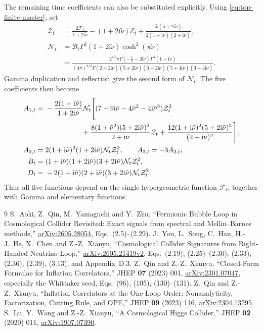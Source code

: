 \documentclass[a4paper,12pt]{article}
\newcommand{\ii}{\mathrm i}
\begin{document}
The remaining time coefficients can also be substituted explicitly.
Using \eqref{eq:top-finite-master}, set
\begin{align}
 \mathcal Z_t&=\frac{2\mathcal F_t}{1+2\ii\tilde\nu}
 -(1+2\ii\tilde\nu)\mathcal E_t
 +\frac{\ii\tilde\nu(5+2\ii\tilde\nu)}
 {2(1+\ii\tilde\nu)(2+\ii\tilde\nu)},\nonumber\\
 \mathcal N_t&=\mathcal B_t\Gamma^2(1+2\ii\tilde\nu)
 \cosh^2(\pi\tilde\nu)\nonumber\\
 &=\frac{2^{4\ii\tilde\nu}\pi\Gamma(-\tfrac12-2\ii\tilde\nu)
 \Gamma^4(1+\ii\tilde\nu)}
 {(4\pi)^{7/2}\Gamma(2+2\ii\tilde\nu)
 (5+2\ii\tilde\nu)(3+2\ii\tilde\nu)
 (5+4\ii\tilde\nu)(3+4\ii\tilde\nu)}.
 \label{eq:top-angular-explicit-common}
\end{align}
Gamma duplication and reflection give the second form of
$\mathcal N_t$. The five coefficients then become
\begin{align}
 A_{1,t}={}&-\frac{2(1+\ii\tilde\nu)}{1+2\ii\tilde\nu}\mathcal N_t
 \Bigg[(7-9\ii\tilde\nu-4\tilde\nu^2-4\ii\tilde\nu^3)\mathcal Z_t^2
 \nonumber\\
 &\hspace{18mm}
 +\frac{8(1+\tilde\nu^2)(5+2\ii\tilde\nu)^2}{2+\ii\tilde\nu}\mathcal Z_t
 +\frac{12(1+\ii\tilde\nu)^2(5+2\ii\tilde\nu)^3}{(2+\ii\tilde\nu)^2}
 \Bigg],\nonumber\\
 A_{2,t}={}&2(1+\ii\tilde\nu)^2(1+2\ii\tilde\nu)\mathcal N_t\mathcal Z_t^2,
 \qquad A_{3,t}=-3A_{2,t},\nonumber\\
 B_t={}&(1+\ii\tilde\nu)(1+2\ii\tilde\nu)(3+2\ii\tilde\nu)
 \mathcal N_t\mathcal Z_t^2,\nonumber\\
 D_t={}&-2(1+\ii\tilde\nu)(2+\ii\tilde\nu)(3+2\ii\tilde\nu)
 \mathcal N_t\mathcal Z_t^2.
 \label{eq:top-angular-explicit-finite}
\end{align}
Thus all five functions depend on the single hypergeometric function
$\mathcal F_t$, together with Gamma and elementary functions.

\begin{thebibliography}{9}
 S.~Aoki, Z.~Qin, M.~Yamaguchi and Y.~Zhu,
``Fermionic Bubble Loop in Cosmological Collider Revisited:
Exact signals from spectral and Mellin--Barnes methods,''
\href{https://arxiv.org/abs/2605.28054}{arXiv:2605.28054},
Eqs.~(2.5)--(2.29).
 J.~You, L.~Song, C.~Han, H.-J.~He, X.~Chen and Z.-Z.~Xianyu,
``Cosmological Collider Signatures from Right-Handed Neutrino Loop,''
\href{https://arxiv.org/abs/2605.21419v2}{arXiv:2605.21419v2},
Eqs.~(2.19), (2.25)--(2.30), (2.33), (2.36), (2.39),
(3.13), and Appendix~D.3.
 Z.~Qin and Z.-Z.~Xianyu, ``Closed-Form Formulae for
Inflation Correlators,'' JHEP \textbf{07} (2023) 001,
\href{https://arxiv.org/abs/2301.07047}{arXiv:2301.07047},
especially the Whittaker seed, Eqs.~(96), (105), (130)--(131).
 Z.~Qin and Z.-Z.~Xianyu, ``Inflation Correlators at the One-Loop Order:
Nonanalyticity, Factorization, Cutting Rule, and OPE,'' JHEP \textbf{09} (2023) 116,
\href{https://arxiv.org/abs/2304.13295}{arXiv:2304.13295}.
 S.~Lu, Y.~Wang and Z.-Z.~Xianyu, ``A Cosmological Higgs Collider,''
JHEP \textbf{02} (2020) 011,
\href{https://arxiv.org/abs/1907.07390}{arXiv:1907.07390}.
\end{thebibliography}
\end{document}
